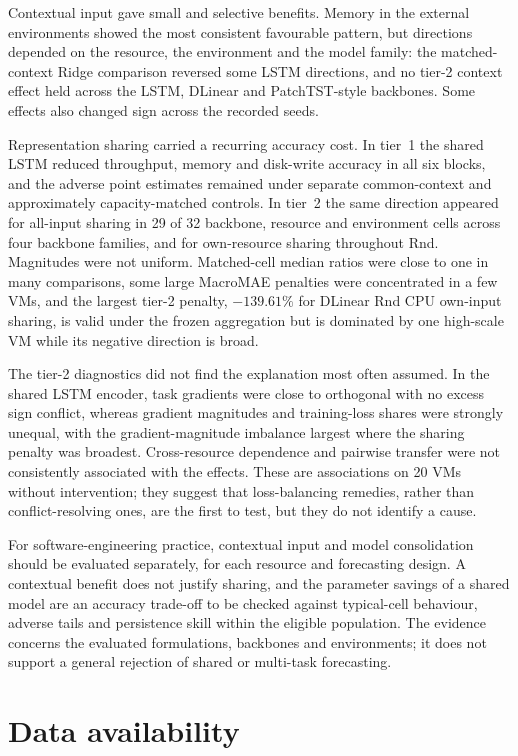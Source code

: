 \documentclass[5p,twocolumn]{elsarticle}
\begin{document}
Contextual input gave small and selective benefits. Memory in the external
environments showed the most consistent favourable pattern, but directions
depended on the resource, the environment and the model family: the
matched-context Ridge comparison reversed some LSTM directions, and no
tier-2 context effect held across the LSTM, DLinear and
PatchTST-style backbones. Some effects also changed sign across the recorded seeds.

Representation sharing carried a recurring accuracy cost. In tier~1 the
shared LSTM reduced throughput, memory and disk-write accuracy in all six
blocks, and the adverse point estimates remained under separate
common-context and approximately capacity-matched controls. In tier~2 the
same direction appeared for all-input sharing in 29 of 32 backbone, resource
and environment cells across four backbone families, and for own-resource
sharing throughout Rnd. Magnitudes were not uniform. Matched-cell median
ratios were close to one in many comparisons, some large MacroMAE penalties
were concentrated in a few VMs, and the largest tier-2 penalty, $-139.61\%$
for DLinear Rnd CPU own-input sharing, is valid under the frozen aggregation
but is dominated by one high-scale VM while its negative direction is broad.

The tier-2 diagnostics did not find the explanation most often assumed. In
the shared LSTM encoder, task gradients were close to orthogonal with no
excess sign conflict, whereas gradient magnitudes and training-loss shares
were strongly unequal, with the gradient-magnitude imbalance largest where
the sharing penalty was broadest. Cross-resource dependence and pairwise
transfer were not consistently associated with the effects. These are
associations on 20 VMs without intervention; they suggest that
loss-balancing remedies, rather than conflict-resolving ones, are the
first to test, but they do not identify a cause.

For software-engineering practice, contextual input and model consolidation
should be evaluated separately, for each resource and forecasting design. A
contextual benefit does not justify sharing, and the parameter savings of a
shared model are an accuracy trade-off to be checked against typical-cell
behaviour, adverse tails and persistence skill within the eligible
population. The evidence concerns the evaluated formulations, backbones and
environments; it does not support a general rejection of shared or
multi-task forecasting.

\section*{Data availability}
\end{document}
